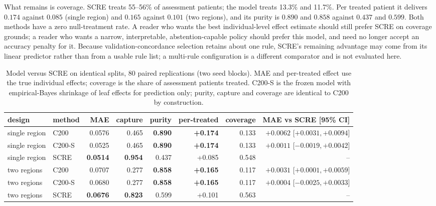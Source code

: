 \documentclass[conference]{IEEEtran}
\begin{document}
What remains is coverage. SCRE treats 55--56\% of assessment patients; the model
treats 13.3\% and 11.7\%. Per treated patient it delivers $0.174$ against
$0.085$ (single region) and $0.165$ against $0.101$ (two regions), and its
purity is $0.890$ and $0.858$ against $0.437$ and $0.599$. Both methods have a
zero null-treatment rate. A reader who wants the best individual-level effect
estimate should still prefer SCRE on coverage grounds; a reader who wants a
narrow, interpretable, abstention-capable policy should prefer this model, and
need no longer accept an accuracy penalty for it. Because
validation-concordance selection retains about one rule, SCRE's remaining
advantage may come from its linear predictor rather than from a usable rule
list; a multi-rule configuration is a different comparator and is not evaluated
here.

\begin{table}[t]
\caption{Model versus SCRE on identical splits, 80 paired replications (two
seed blocks). MAE and per-treated effect use the true individual effects;
coverage is the share of assessment patients treated. C200-S is the frozen
model with empirical-Bayes shrinkage of leaf effects for prediction only;
purity, capture and coverage are identical to C200 by construction.}
\label{tab:scre}
\centering
\footnotesize
\setlength{\tabcolsep}{6pt}
\begin{tabular}{@{}llrrrrrr@{}}
\toprule
design & method & MAE & capture & purity & per-treated & coverage &
MAE vs SCRE [95\% CI]\\
\midrule
single region & C200 & 0.0576 & 0.465 & \textbf{0.890} & \textbf{+0.174} &
0.133 & $+0.0062$ [$+0.0031,+0.0094$]\\
single region & C200-S & 0.0525 & 0.465 & \textbf{0.890} & \textbf{+0.174} &
0.133 & $+0.0011$ [$-0.0019,+0.0042$]\\
single region & SCRE & \textbf{0.0514} & \textbf{0.954} & 0.437 & +0.085 &
0.548 & --\\
\midrule
two regions & C200 & 0.0707 & 0.277 & \textbf{0.858} & \textbf{+0.165} &
0.117 & $+0.0031$ [$+0.0001,+0.0059$]\\
two regions & C200-S & 0.0680 & 0.277 & \textbf{0.858} & \textbf{+0.165} &
0.117 & $+0.0004$ [$-0.0025,+0.0033$]\\
two regions & SCRE & \textbf{0.0676} & \textbf{0.823} & 0.599 & +0.101 &
0.563 & --\\
\bottomrule
\end{tabular}
\end{table}
\end{document}
